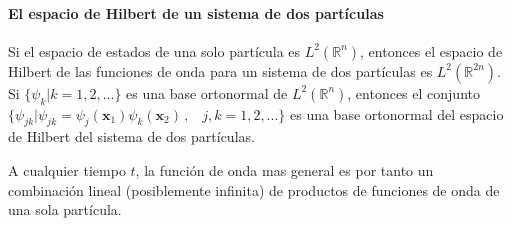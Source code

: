 \documentclass[12pt]{book}
\numberwithin{equation}{chapter}
\def\R{\mathbb{R}}
\def\x{\mathbf{x}}
\begin{document}
\paragraph{El espacio de Hilbert de un sistema de dos part\'iculas} 
Si el espacio de estados de una solo part\'icula es $L^{2}(\R^{n})$, entonces el espacio de Hilbert de las funciones de onda para un sistema de dos part\'iculas es $L^{2}(\R^{2n})$. Si $\{ \psi_{k} | k=1,2,... \}$ es una base ortonormal de $L^{2}(\R^{n})$, entonces el conjunto $ \{ \psi_{jk} | \psi_{jk}= \psi_{j}(\x_{1}) \psi_{k}(\x_{2})\,,\,\,\,\,\, j,k=1,2,... \} $ es una base ortonormal del espacio de Hilbert del sistema de dos part\'iculas.

\rightline{$\dag$}
\vspace{3 mm}

A cualquier tiempo $t$, la funci\'on de onda mas general es por tanto un combinaci\'on lineal (posiblemente infinita) de productos de funciones de onda de una sola part\'icula.
\end{document}
